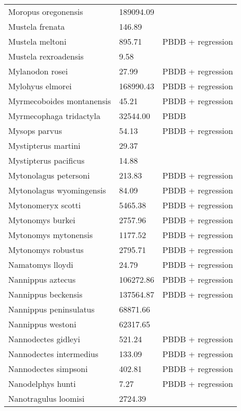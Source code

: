\documentclass{article}
\begin{document}
\begin{center}
\begin{longtable}{p{} p{} p{}}
    Moropus oregonensis & 189094.09 & \cite{Tomiya2013} \\ 
    Mustela frenata & 146.89 & \cite{Smith2004} \\ 
    Mustela meltoni & 895.71 & PBDB + regression \\ 
    Mustela rexroadensis & 9.58 & \cite{Tomiya2013} \\ 
    Mylanodon rosei & 27.99 & PBDB + regression \\ 
    Mylohyus elmorei & 168990.43 & PBDB + regression \\ 
    Myrmecoboides montanensis & 45.21 & PBDB + regression \\ 
    Myrmecophaga tridactyla & 32544.00 & PBDB \\ 
    Mysops parvus & 54.13 & PBDB + regression \\ 
    Mystipterus martini & 29.37 & \cite{Tomiya2013} \\ 
    Mystipterus pacificus & 14.88 & \cite{Tomiya2013} \\ 
    Mytonolagus petersoni & 213.83 & PBDB + regression \\ 
    Mytonolagus wyomingensis & 84.09 & PBDB + regression \\ 
    Mytonomeryx scotti & 5465.38 & PBDB + regression \\ 
    Mytonomys burkei & 2757.96 & PBDB + regression \\ 
    Mytonomys mytonensis & 1177.52 & PBDB + regression \\ 
    Mytonomys robustus & 2795.71 & PBDB + regression \\ 
    Namatomys lloydi & 24.79 & PBDB + regression \\ 
    Nannippus aztecus & 106272.86 & PBDB + regression \\ 
    Nannippus beckensis & 137564.87 & PBDB + regression \\ 
    Nannippus peninsulatus & 68871.66 & \cite{Tomiya2013} \\ 
    Nannippus westoni & 62317.65 & \cite{Tomiya2013} \\ 
    Nannodectes gidleyi & 521.24 & PBDB + regression \\ 
    Nannodectes intermedius & 133.09 & PBDB + regression \\ 
    Nannodectes simpsoni & 402.81 & PBDB + regression \\ 
    Nanodelphys hunti & 7.27 & PBDB + regression \\ 
    Nanotragulus loomisi & 2724.39 & \cite{Tomiya2013} \\ 

\end{longtable}
\end{center}
\end{document}
